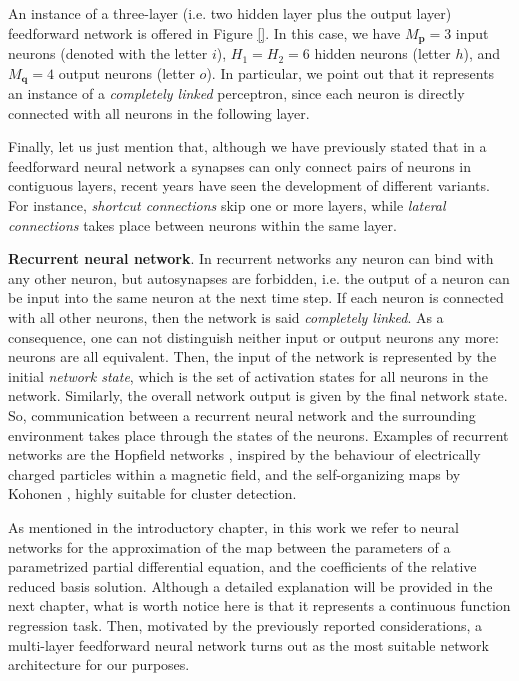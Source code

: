 \documentclass[11pt, a4paper]{report}
\theoremstyle{theorem}
\numberwithin{equation}{section}
\numberwithin{figure}{section}
\begin{document}
		An instance of a three-layer (i.e. two hidden layer plus the output layer) feedforward network is offered in Figure \ref{}. In this case, we have $M_{\boldsymbol{p}} = 3$ input neurons (denoted with the letter $i$), $H_1 = H_2 = 6$ hidden neurons (letter $h$), and $M_{\boldsymbol{q}} = 4$ output neurons (letter $o$). In particular, we point out that it represents an instance of a \emph{completely linked} perceptron, since each neuron is directly connected with all neurons in the following layer.
		
		Finally, let us just mention that, although we have previously stated that in a feedforward neural network a synapses can only connect pairs of neurons in contiguous layers, recent years have seen the development of different variants. For instance, \emph{shortcut connections} skip one or more layers, while \emph{lateral connections} takes place between neurons within the same layer. 
				
		\vspace*{0.3cm}
		
		\noindent \textbf{Recurrent neural network}. In recurrent networks any neuron can bind with any other neuron, but autosynapses are forbidden, i.e. the output of a neuron can be input into the same neuron at the next time step. If each neuron is connected with all other neurons, then the network is said \emph{completely linked}. As a consequence, one can not distinguish neither input or output neurons any more: neurons are all equivalent. Then, the input of the network is represented by the initial \emph{network state}, which is the set of activation states for all neurons in the network. Similarly, the overall network output is given by the final network state. So, communication between a recurrent neural network and the surrounding environment takes place through the states of the neurons. Examples of recurrent networks are the Hopfield networks \cite{}, inspired by the behaviour of electrically charged particles within a magnetic field, and the self-organizing maps by Kohonen \cite{}, highly suitable for cluster detection.
		
		\vspace*{0.3cm}
		
		As mentioned in the introductory chapter, in this work we refer to neural networks for the approximation of the map between the parameters of a parametrized partial differential equation, and the coefficients of the relative reduced basis solution. Although a detailed explanation will be provided in the next chapter, what is worth notice here is that it represents a continuous function regression task. Then, motivated by the previously reported considerations, a multi-layer feedforward neural network turns out as the most suitable network architecture for our purposes. 
		
\end{document}

